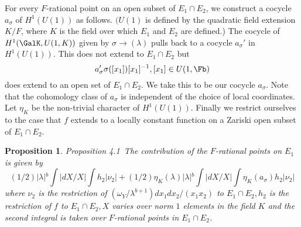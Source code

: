 \documentclass{memo-l}
\newtheorem{proposition}[theorem]{Proposition}
\theoremstyle{definition}
\theoremstyle{remark}
\numberwithin{section}{chapter}
\numberwithin{equation}{chapter}
\begin{document}
   For every $F$-rational point on an open subset of $E_{1} \cap E_{2}$, we
construct a cocycle $a_{{\sigma}}$ of $H^{1}(U(1))$ as follows.  $(U(1)$ is
defined by the quadratic field extension $K/F$, where $K$ is the field over
which $E_{1}$ and $E_{2}$ are defined.) The cocycle of
$H^{1}(\GalK,U(1,K))$ given by ${\sigma} {\to} ({\lambda})$ pulls back
to a cocycle $a_{{\sigma}}'$ in $H^{1}(U(1))$.  This does not extend to
$E_{1} \cap E_{2}$ but
$$
a_{{\sigma}}'{\sigma}([x_{1}])[x_{1}]^{-1}, [x_{1}] \in U(1,\Fb)
$$
does extend to an open set of $E_{1} \cap E_{2}$.  We take this to be our
cocycle $a_{{\sigma}}$.  Note that the cohomology class of $a_{{\sigma}}$
is independent of the choice of local coordinates.  Let ${\eta}_{K}$ be the
non-trivial character of $H^{1}(U(1))$.  Finally we restrict ourselves to
the case that $f$ extends to a locally constant function on a Zariski open
subset of $E_{1} \cap E_{2}$.

\begin{proposition}{Proposition 4.1}\ The contribution of the $F$-rational points
on $E_{1}$ is given by
$$
(1/2)\vert {\lambda}\vert {}^{b} \int \vert dX/X\vert \int
h_{2}\vert {\nu}_{2}\vert +
(1/2){\eta}_{K}({\lambda})\vert {\lambda}\vert {}^{b} \int
\vert dX/X\vert \int {\eta}_{K}(a_{{\sigma}})h_{2}\vert {\nu}_{2}\vert
$$
where ${\nu}_{2}$ is the restriction of
$({\omega}_{Y}/{\lambda}^{b+1})dx_{1}dx_{2}/(x_{1}x_{2})$ to $E_{1} \cap
E_{2}, h_{2}$ is the restriction of $f$ to $E_{1} \cap E_{2}, X$ varies
over norm $1$ elements in the field $K$ and the second integral is taken
over $F$-rational points in $E_{1} \cap E_{2}$.
\end{proposition}
\end{document}
